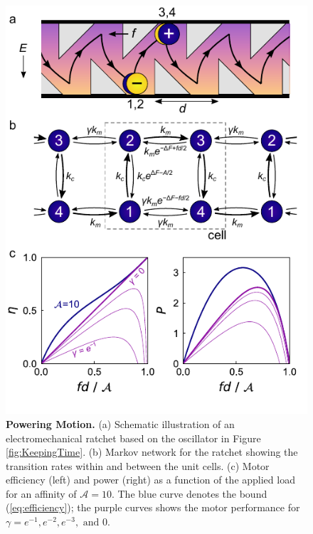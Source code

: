 \begin{appendices}
\begin{figure}[ht]
    \centering
    \includegraphics{figures/A5_PoweringMotion.pdf}
    \caption{\textbf{Powering Motion.} (a) Schematic illustration of an electromechanical ratchet based on the oscillator in Figure \ref{fig:KeepingTime}. (b) Markov network for the ratchet showing the transition rates within and between the unit cells. (c) Motor efficiency (left) and power (right) as a function of the applied load for an affinity of $\mathcal{A}=10$. The blue curve denotes the bound (\ref{eq:efficiency}); the purple curves shows the motor performance for $\gamma=e^{-1}, e^{-2}, e^{-3},  \text{ and } 0$.}
    \label{fig:PoweringMotion}
\end{figure}


\end{appendices}
